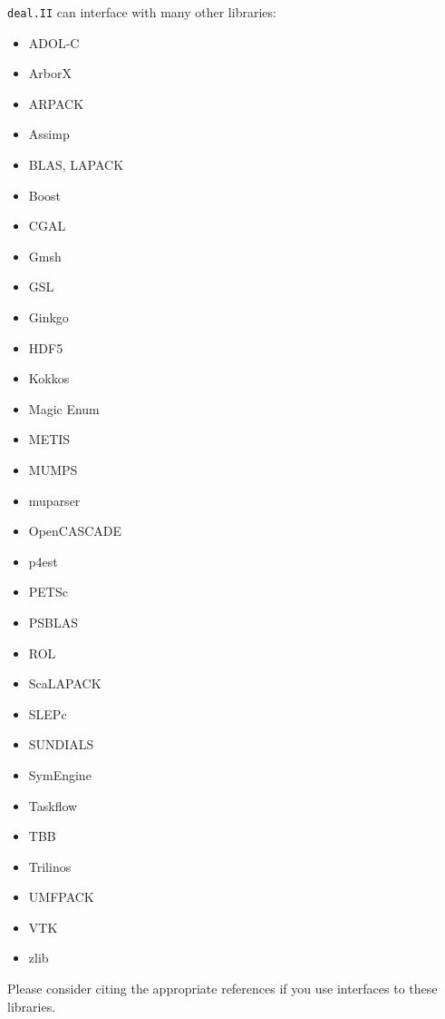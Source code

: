 \documentclass{ansarticle-preprint}
\newcommand{\specialword}[1]{\texttt{#1}}
\newcommand{\dealii}{{\specialword{deal.II}}\xspace}
\begin{document}
\dealii can interface with many other libraries:
\begin{multicols}{4}
  \begin{itemize}[leftmargin=4mm]
    \item ADOL-C \cite{griewank1996adolc}
    \item ArborX \cite{prokopenko2025}
    \item ARPACK \cite{lehoucq1998arpack}
    \item Assimp \cite{schulze2021assimp}
    \item BLAS, LAPACK \cite{anderson1999lapack}
    \item Boost \cite{boost-web-page}
    \item CGAL \cite{cgal:eb-24b}
    \item Gmsh \cite{geuzaine2009gmsh}
    \item GSL \cite{galassi2009gsl,gsl-web-page}
    \item Ginkgo \cite{anzt2020ginkgo,anzt2022ginkgo}
    \item HDF5 \cite{hdf5-web-page}
    \item Kokkos \cite{trott2022}
    \item Magic Enum \cite{magic-enum-web-page}
    \item METIS \cite{karypis1998metis}
    \item MUMPS \cite{amestoy2001mumps,amestoy2019mumps}
    \item muparser \cite{muparser-web-page}
    \item OpenCASCADE \cite{opencascade-web-page}
    \item p4est \cite{burstedde2011p4est}
    \item PETSc \cite{petsc-user-ref,petsc-web-page}
    \item PSBLAS \cite{Filippone2000psblas}
    \item ROL \cite{ROL2022ICCOPT}
    \item ScaLAPACK \cite{blackford1997scalapack}
    \item SLEPc \cite{roman2023improvements}
    \item SUNDIALS \cite{gardner2022enabling}
    \item SymEngine \cite{symengine-web-page}
    \item Taskflow \cite{huang2021taskflow}
    \item TBB \cite{reinders2007tbb}
    \item Trilinos \cite{mayr2025trilinos,trilinos-web-page}
    \item UMFPACK \cite{davis2004umfpack}
    \item VTK \cite{vtk-web-page}
    \item zlib \cite{zlib-web-page}
  \end{itemize}
\end{multicols}
Please consider citing the appropriate references if you use
interfaces to these libraries.
\end{document}
